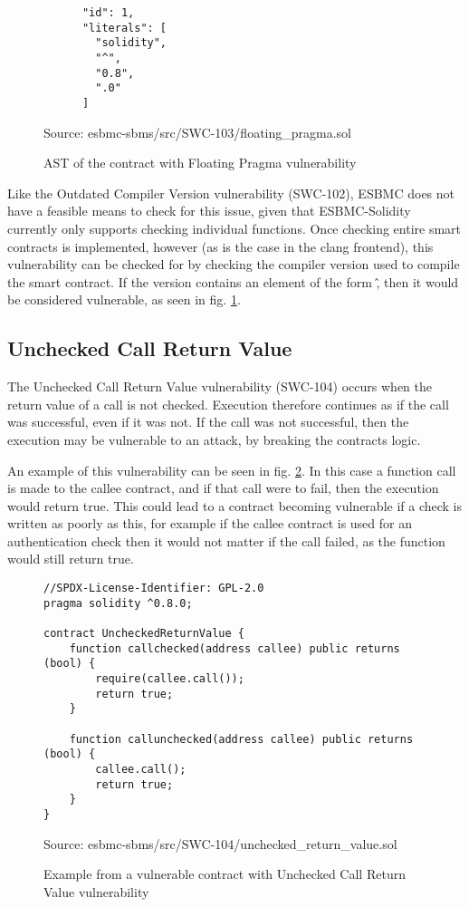 \begin{figure}
\begin{lstlisting}
      "id": 1,
      "literals": [
        "solidity",
        "^",
        "0.8",
        ".0"
      ]
\end{lstlisting}
\caption{AST of the contract with Floating Pragma vulnerability}
Source: esbmc-sbms/src/SWC-103/floating\_pragma.sol
\label{fig:floating_pragma_ast}
\end{figure}

Like the Outdated Compiler Version vulnerability (SWC-102), ESBMC does not have a feasible means to check for this issue, given that ESBMC-Solidity currently only supports checking individual functions. Once checking entire smart contracts is implemented, however (as is the case in the clang frontend), this vulnerability can be checked for by checking the compiler version used to compile the smart contract. If the version contains an element of the form \^, then it would be considered vulnerable, as seen in fig. \ref{fig:floating_pragma_ast}. 

\subsection{Unchecked Call Return Value}
\label{sec:unchecked_call_return_value}

The Unchecked Call Return Value vulnerability (SWC-104) occurs when the return value of a call is not checked. Execution therefore continues as if the call was successful, even if it was not. If the call was not successful, then the execution may be vulnerable to an attack, by breaking the contracts logic.

An example of this vulnerability can be seen in fig. \ref{fig:unchecked_return_value}. In this case a function call is made to the callee contract, and if that call were to fail, then the execution would return true. This could lead to a contract becoming vulnerable if a check is written as poorly as this, for example if the callee contract is used for an authentication check then it would not matter if the call failed, as the function would still return true.

\begin{figure}
\begin{lstlisting}
//SPDX-License-Identifier: GPL-2.0
pragma solidity ^0.8.0;

contract UncheckedReturnValue {
    function callchecked(address callee) public returns (bool) {
        require(callee.call());
        return true;
    }

    function callunchecked(address callee) public returns (bool) {
        callee.call();
        return true;
    }
}
\end{lstlisting}
\caption{Example from a vulnerable contract with Unchecked Call Return Value vulnerability }
Source: esbmc-sbms/src/SWC-104/unchecked\_return\_value.sol
\label{fig:unchecked_return_value}
\end{figure}


